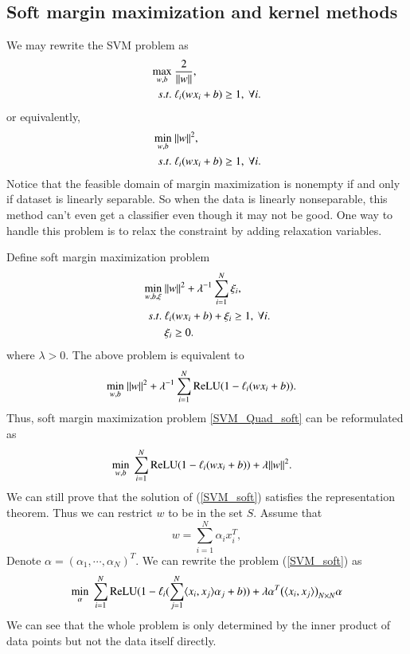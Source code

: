 \subsection{Soft margin maximization and kernel methods}

We may rewrite the SVM problem as
\begin{align} 
	\max_{w,b}&\ {2\over \|w\|},\\
	s.t.&\ \ell_i(wx_i+b) \geq 1,\ \forall i. 
\end{align}
or equivalently,
\begin{align}{\label{SVM_Quad}}
	\min_{w,b}&\ \|w\|^2,\\
	s.t.&\ \ell_i(wx_i+b) \geq 1,\ \forall i. 
\end{align}
Notice that the feasible domain of margin maximization is nonempty if and only if dataset is linearly separable. So when the data is linearly nonseparable, this method can't even get a classifier even though it may not be good. One way to handle this problem is to relax the constraint by adding relaxation variables. 

Define soft margin maximization problem
\begin{align}{\label{SVM_Quad_soft}}
\min_{w,b,\xi}&\ \|w\|^2 + \lambda^{-1} \sum_{i = 1}^N\xi_i,\\
s.t.&\ \ell_i(wx_i+b) + \xi_i \geq 1,\ \forall i. \\
     &\ \xi_i \geq 0.
\end{align}
where $\lambda>0$. The above problem is equivalent to
 \begin{align}
 \min_{w,b}&\ \|w\|^2 + \lambda^{-1} \sum_{i = 1}^N {\rm ReLU}(1-\ell_i(wx_i+b)).
 \end{align}
Thus, soft margin maximization problem \eqref{SVM_Quad_soft} can be reformulated as
 \begin{align}{\label{SVM_soft}}
\min_{w,b}&\  \sum_{i = 1}^N {\rm ReLU}(1-\ell_i(wx_i+b)) + \lambda \|w\|^2.
\end{align}
We can still prove that the solution of (\ref{SVM_soft}) satisfies the representation theorem. Thus we can restrict $w$ to be in the set $S$. Assume that  
\begin{equation}
	w = \sum_{i = 1}^N \alpha_i x_i^T, 
\end{equation}
Denote $\alpha = (\alpha_1,\cdots,\alpha_N)^T$. We can rewrite the problem (\ref{SVM_soft}) as 
\begin{equation}
\min_{\alpha}\ \sum_{i = 1}^N {\rm ReLU}(1-\ell_i(\sum_{j = 1}^N \langle x_i,x_j\rangle \alpha_j+b)) + \lambda\alpha^T \big(\langle x_i,x_j\rangle\big)_{N\times N} \alpha\\
\end{equation}
We can see that the whole problem is only determined by the inner product of data points but not the data itself directly. \\

